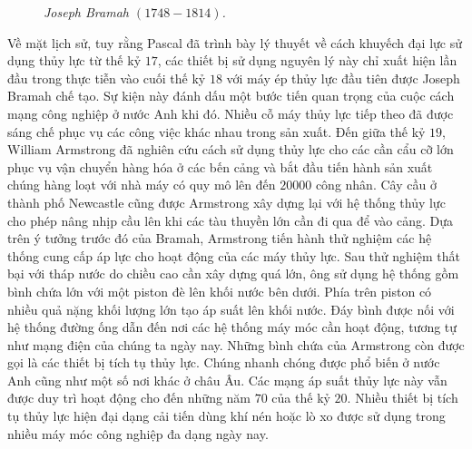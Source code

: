 \begin{multicols}{2}
\begin{figure}[H]
		\caption{\small\textit{\color{timhieukhoahoc}Joseph Bramah $(1748-1814)$.}}
		\vspace*{-10pt}
	\end{figure}
	Về mặt lịch sử, tuy rằng Pascal đã trình bày lý thuyết về cách khuyếch đại lực sử dụng thủy lực từ thế kỷ $17$, các thiết bị sử dụng nguyên lý này chỉ xuất hiện lần đầu trong thực tiễn vào cuối thế kỷ $18$ với  máy ép thủy lực đầu tiên được Joseph Bramah chế tạo. Sự kiện này đánh dấu một bước tiến quan trọng của cuộc cách mạng công nghiệp ở nước Anh khi đó. Nhiều cỗ máy thủy lực tiếp theo đã được sáng chế phục vụ các công việc khác nhau trong sản xuất. Đến giữa thế kỷ $19$, William Armstrong đã nghiên cứu cách sử dụng thủy lực cho các cần cẩu cỡ lớn phục vụ vận chuyển hàng hóa ở các bến cảng và bắt đầu tiến hành sản xuất chúng hàng loạt với nhà máy có quy mô lên đến $20000$ công nhân. Cây cầu ở thành phố Newcastle cũng được Armstrong xây dựng lại với hệ thống thủy lực cho phép nâng nhịp cầu lên khi các tàu thuyền lớn cần đi qua để vào cảng.
	\vskip 0.1cm
	Dựa trên ý tưởng trước đó của Bramah, Armstrong tiến hành thử nghiệm các hệ thống cung cấp áp lực cho hoạt động của các máy thủy lực. Sau thử nghiệm thất bại với tháp nước do chiều cao cần xây dựng quá lớn, ông sử dụng hệ thống gồm bình chứa lớn với một piston đè lên khối nước bên dưới. Phía trên piston có nhiều quả nặng khối lượng lớn tạo áp suất lên khối nước. Đáy bình được nối với hệ thống đường ống dẫn đến nơi các hệ thống máy móc cần hoạt động, tương tự như mạng điện của chúng ta ngày nay. Những bình chứa của Armstrong còn được gọi là các thiết bị tích tụ thủy lực. Chúng nhanh chóng được phổ biến ở nước Anh cũng như một số nơi khác ở châu Âu. Các mạng áp suất thủy lực này vẫn được duy trì hoạt động cho đến những năm $70$ của thế kỷ $20$. Nhiều thiết bị tích tụ thủy lực hiện đại dạng cải tiến dùng khí nén hoặc lò xo được sử dụng trong nhiều máy móc công nghiệp đa dạng ngày nay.
	\begin{figure}[H]
		\vspace*{-5pt}
		\centering
		\captionsetup{labelformat= empty, justification=centering}

\end{figure}
\end{multicols}
